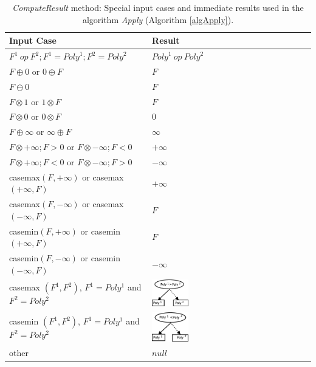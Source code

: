 \documentclass[twoside,11pt]{article}
\begin{document}
\begin{table}[!h]
\begin{center}
    \begin{tabular}{|l|l|l|}
	 \hline
	 Input Case & Result \\ \hline \hline
      $F^1\ \mathit{op}\ F^2; F^1=\mathit{Poly}^1; F^2=\mathit{Poly}^2$ & $\mathit{Poly}^1\ \mathit{op}\ \mathit{Poly}^2$ \\
	 \hline
          $F \oplus 0$ or $0 \oplus F$ & $F$\\
	 \hline
         $F  \ominus 0$ & $F$\\
	 \hline
         $F  \otimes 1$ or $1  \otimes F$ & $F$\\
	 \hline
         $F  \otimes 0$ or $0  \otimes F$ & $0$\\
	 \hline
          $F \oplus \infty $ or $\infty \oplus F $ & $\infty$\\
	 \hline
          $F  \otimes +\infty ; F > 0$ or $F  \otimes -\infty ; F < 0$  & $+\infty$\\
      \hline
          $F  \otimes +\infty ; F < 0$ or $F  \otimes -\infty ; F > 0$  & $-\infty$\\
	 \hline
          casemax$(F, +\infty)$ or casemax$(+\infty, F)$  & $+\infty$\\
	 \hline
          casemax$(F, -\infty)$ or casemax$(-\infty, F)$  & $F$\\
	 \hline
	      casemin$(F, +\infty)$ or casemin$(+\infty, F)$  & $F$\\
	 \hline
          casemin$(F, -\infty)$ or casemin$(-\infty, F)$  & $-\infty$\\
           \hline
          casemax $(F^1  , F^2)$, $F^1=Poly^1$ and $F^2=Poly^2$   &\hspace{3mm} \includegraphics[width=0.25\textwidth]{FiguresSource/max_result.eps}\\
	 \hline
          casemin $(F^1, F^2)$, $F^1=Poly^1$ and $F^2=Poly^2$ &\hspace{3mm}  \includegraphics[width=0.25\textwidth]{FiguresSource/min_result.eps}\\
	 \hline
	  other& $\mathit{null}$\\
         \hline
    \end{tabular}
  \caption{\emph{ComputeResult} method: Special input cases and immediate results used in the algorithm \emph{Apply} (Algorithm \ref{algApply}).
  }
  \label{tab:ComputeResultXADD}
\end{center}
\end{table}
\end{document}
